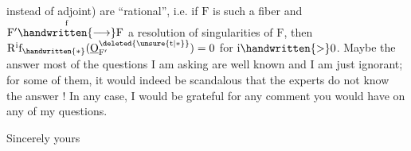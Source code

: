 instead of adjoint) are ``rational'', i.e. if $\mathrm{F}$ is such a fiber and $\mathrm{F}'\overset{\mathrm{f}}{\handwritten{\longrightarrow}}\mathrm{F}$ a resolution of singularities of $\mathrm{F}$, then $\mathrm{R}^{\mathrm{i}}\mathrm{f}_{\handwritten{*}}(\underline{\mathrm{O}}_{\mathrm{F}'}^{\deleted{\unsure{\mathrm{t}|*}}})=0$ for $\mathrm{i}\handwritten{>}0$. Maybe the answer  most of the questions I am asking are well known and I am just ignorant; for some of them, it would indeed be scandalous that the experts do not know the answer ! In any case, I would be grateful for any comment you would have on any of my questions.

Sincerely yours\\
\\



